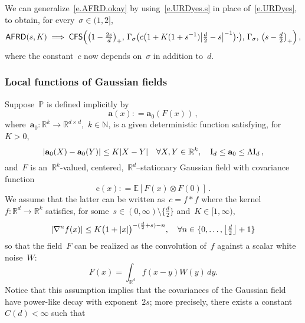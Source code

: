 \documentclass[11pt,twoside]{article} %
\numberwithin{equation}{section}
\theoremstyle{definition}
\let\originalleft\left
\let\originalright\right
\renewcommand{\left}{\mathopen{}\mathclose\bgroup\originalleft}
\renewcommand{\right}{\aftergroup\egroup\originalright}
\newcommand*{\Id}{\ensuremath{\mathrm{I}_d}}
\newcommand*{\N}{\ensuremath{\mathbb{N}}}
\newcommand*{\R}{\ensuremath{\mathbb{R}}}
\newcommand*{\Rd}{\ensuremath{\mathbb{R}^d}}
\renewcommand{\a}{\mathbf{a}}
\renewcommand{\P}{\mathbb{P}}
\newcommand{\E}{\mathbb{E}}
\newcommand{\CFS}{\mathsf{CFS}}
\newcommand{\AFRD}{\mathsf{AFRD}}
\begin{document}
\smallskip

We can generalize~\eqref{e.AFRD.okay} by using~\eqref{e.URDyes.s} in place of~\eqref{e.URDyes}, to obtain, for every~$\sigma \in (1,2]$, 
\begin{equation}
\label{e.AFRD.okay.sigma}
\AFRD\left(s,K \right) \implies
\CFS \Bigl(  
\bigl( 1 - \tfrac {2s}{d} \bigr)_+ , \,
\Gamma_\sigma \bigl( c\bigl( 1 + K (1+s^{-1}) \bigl| \tfrac d2-s\bigr|^{-1} \bigr)   \cdot \bigr), \,
\Gamma_\sigma, \,
\bigl( s - \tfrac d2 \bigr)_+
\Bigr)\,,
\end{equation}
where the constant~$c$ now depends on~$\sigma$ in addition to~$d$.

\subsubsection{Local functions of Gaussian fields}
\label{ss.GRF}
Suppose~$\P$ is defined implicitly by
\begin{equation}
\label{e.Gaussa0}
\a (x) : = \a_0(F(x)) \,,
\end{equation}
where~$\a_0 : \R^k \to \R^{d\times d}$,~$k\in\N$, is a given deterministic function satisfying, for~$K>0$,  
\begin{equation}
\label{e.Gaussa0.lip}
\left| \a_0 (X) - \a_0(Y) \right| \leq K |X-Y| \quad \forall X,Y \in \R^k, \quad 
 \Id \leq \a_0 \leq \Lambda  \Id
\,,
\end{equation}
and~$F$ is an~$\R^k$-valued, centered,~$\Rd$--stationary Gaussian field with covariance function 
\begin{equation}
\mathrm{c}(x) : = \E [ F(x) \otimes F(0) ]\,.
\end{equation}
We assume that the latter can be written as~$c = f \ast f$ where the kernel~$f:\Rd \to \R^k$ satisfies, for some~$s \in (0,\infty) \setminus \{ \tfrac d2 \}$ and~$K\in [1,\infty)$, 
\begin{equation}
\label{e.kerneldecay.ass}
\left| \nabla^n f(x) \right|
\leq 
K\bigl(1+|x| \bigr)^{-(\frac d2+s)-n},
\quad 
\forall n\in\{ 0,\ldots, \left\lfloor \tfrac d2 \right\rfloor +1\}
\end{equation}
so that the field~$F$ can be realized as the convolution of~$f$ against a scalar white noise~$W$:
\begin{equation}
F(x) = \int_{\Rd} f(x-y)W(y)\,dy.
\end{equation}
Notice that this assumption implies that the covariances of the Gaussian field have power-like decay with exponent~$2s$; more precisely, there exists a constant~$C(d)<\infty$ such that
\end{document}
